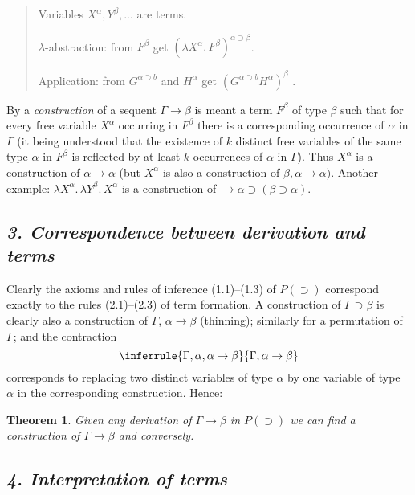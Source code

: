 \documentclass[12pt]{article}
\def\imp{\rightarrow}
\def\l{\lambda}
\def\limp{\supset}
\def\PI{P(\limp)}
\def\G{\Gamma}
\def\a{\alpha}
\def\b{\beta}
\def\ab{\a \imp \b}
\newtheorem{theorem}{Theorem}
\begin{document}
\begin{quote}
\begin{description}[font=\normalfont]

\item[(2.1)] Variables $X^\a, Y^\b, ... $ are terms.

\item[(2.2)] $\l$-abstraction: from $F^\b$ get $(\l X^\a .\, F^\b )^{\a \limp \b}$.

\item[(2.3)] Application: from $G^{\a \limp b}$ and $H^\a$ get $(G^{\a \limp b} H^\a )^\b$ .
\end{description}
\end{quote}
By a {\it construction} of a sequent $\G \imp \b$ is meant a term $F^\b$ of type $\b$ such that for
every free variable $X^\a$ occurring in $F^\b$ there is a corresponding occurrence of $\a$
in $\G$ (it being understood that the existence of $k$ distinct free variables of the
same type $\a$ in $F^\b$ is reflected by at least $k$ occurrences of $\a$ in $\G$). Thus $X^\a$ is
a construction of $\a \imp \a$ (but $X^\a$ is also a construction of $\b, \a \imp \a)$. Another 
example: $\l X^\a .\, \l Y^\b .\, X^\a$ is a construction of $\imp \a \limp (\b \limp \a)$.

\subsection{\it 3. Correspondence between derivation and terms}

Clearly the axioms and rules of inference (1.1)--(1.3) of $\PI$ correspond exactly to the rules 
(2.1)--(2.3) of term formation. A construction of $\G \limp \b$ is clearly also a construction of $\G$, $\ab$
(thinning); similarly for a permutation of $\G$; and the contraction
$$
\inferrule{\G, \a, \ab}{\G, \ab}
$$
corresponds to replacing two distinct variables of type $\a$
by one variable of type $\a$ in the corresponding construction. Hence:
\begin{theorem}
Given any derivation of $\G \imp \b$ in $\PI$ we can find a construction of $\G \imp \b$ and conversely.
\end{theorem}

\subsection{\it 4. Interpretation of terms}

\def\fxg{[F^\a/X^\a]G^\b}
\end{document}
